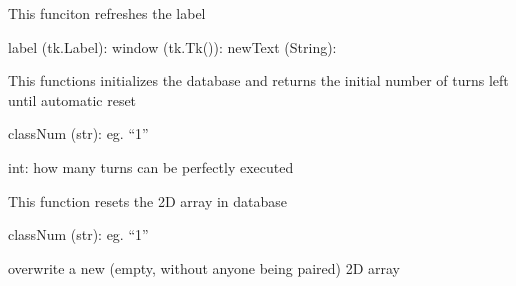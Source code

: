\documentclass[letterpaper,10pt,english]{sphinxmanual}
\begin{document}

\begin{fulllineitems}
\label{\detokenize{GUI:GUI.refreshPairingLabel}}
\pysigstartsignatures
{}
\pysigstopsignatures
\sphinxAtStartPar
This funciton refreshes the label
\begin{description}
\sphinxAtStartPar
label (tk.Label): 
window (tk.Tk()):
newText (String):

\end{description}

\end{fulllineitems}


\begin{fulllineitems}
\label{\detokenize{GUI:GUI.resetDatabase}}
\pysigstartsignatures
{}
\pysigstopsignatures
\sphinxAtStartPar
This functions initializes the database and returns the initial number of turns left until automatic reset
\begin{description}
\sphinxAtStartPar
classNum (str): eg. “1”

\sphinxAtStartPar
int: how many turns can be perfectly executed

\end{description}

\end{fulllineitems}


\begin{fulllineitems}
\label{\detokenize{GUI:GUI.resetMiddle}}
\pysigstartsignatures
{}
\pysigstopsignatures
\sphinxAtStartPar
This function resets the 2D array in database
\begin{description}
\sphinxAtStartPar
classNum (str): eg. “1”

\sphinxAtStartPar
overwrite a new (empty, without anyone being paired) 2D array

\end{description}

\end{fulllineitems}
\end{document}

